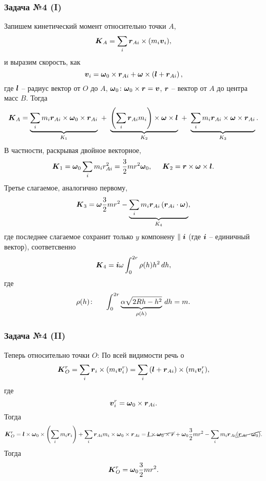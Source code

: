 \subsubsection*{Задача №4 (I)}

Запишем кинетический момент относительно точки $A$,
\begin{equation}
    \mbox{\boldmath $K$}_A = \sum_i \mbox{\boldmath $r$}_{Ai} \times (m_i \mbox{\boldmath $v$}_i),
\end{equation}
и выразим скорость, как
$$
    \mbox{\boldmath $v$}_i = \mbox{\boldmath $\omega$}_0 \times  \mbox{\boldmath $r$}_{Ai} + \mbox{\boldmath $\omega$} \times \left(
    \mbox{\boldmath $l$} + \mbox{\boldmath $r$}_{Ai}
    \right),
$$
где $\mbox{\boldmath $l$}$ -- радиус вектор от $O$ до $A$, $\mbox{\boldmath $\omega$}_0 \colon \mbox{\boldmath $\omega$}_0 \times \mbox{\boldmath $r$} = \mbox{\boldmath $v$}$, $\mbox{\boldmath $r$}$ -- вектор от $A$ до центра масс $B$.
Тогда
$$
    \mbox{\boldmath $K$}_A = 
    \underbrace{
        \sum_i m_i \mbox{\boldmath $r$}_{Ai} \times \mbox{\boldmath $\omega$}_0 \times \mbox{\boldmath $r$}_{Ai}
    }_{K_1}
    \ + \
    \underbrace{
        \left(\sum_i \mbox{\boldmath $r$}_{Ai} m_i\right) \times \mbox{\boldmath $\omega$} \times \mbox{\boldmath $l$}
    }_{K_2}
    \ + \
    \underbrace{
        \sum_i m_i \mbox{\boldmath $r$}_{Ai} \times \mbox{\boldmath $\omega$} \times \mbox{\boldmath $r$}_{Ai}
    }_{K_3}.
$$
В частности, раскрывая двойное векторное,
$$
    \mbox{\boldmath $K$}_1 = \mbox{\boldmath $\omega$}_0 \sum_i m_i r_{Ai}^2 = \frac{3}{2} m r^2 \mbox{\boldmath $\omega$}_0,
    \hspace{0.5cm} 
    \mbox{\boldmath $K$}_2 = \mbox{\boldmath $r$} \times \mbox{\boldmath $\omega$} \times \mbox{\boldmath $l$}.
$$
Третье слагаемое, аналогично первому,
$$
    \mbox{\boldmath $K$}_3 = \mbox{\boldmath $\omega$} \frac{3}{2} m r^2 -
    \underbrace{
    \sum_i m_i \mbox{\boldmath $r$}_{Ai} \left(\mbox{\boldmath $r$}_{Ai} \cdot \mbox{\boldmath $\omega$}\right)
    }_{K_4}
    ,
$$
где последнее слагаемое сохранит только $y$ компонену $\parallel \mbox{\boldmath $i$}$ (где $\mbox{\boldmath $i$}$ -- единичный вектор), соответсвенно
$$
    \mbox{\boldmath $K$}_4 = \mbox{\boldmath $i$} \omega \int_{0}^{2r} \rho(h) h^2 \, d h,
$$
где
$$
    \rho(h) \colon \hspace{0.5cm} 
    \int_{0}^{2r} 
    \underbrace{
    \alpha \sqrt{2 Rh - h^2} 
    }_{\rho(h)}
    \, d h 
    = m.
$$



\subsubsection*{Задача №4 (II)}

Теперь относительно точки $O$:
По всей видимости речь о 
$$
    \mbox{\boldmath $K$}_O^r = \sum_i \mbox{\boldmath $r$}_i \times (m_i \mbox{\boldmath $v$}^r_i) =
    \sum_i \left(\mbox{\boldmath $l$} + \mbox{\boldmath $r$}_{Ai}\right) \times (m_i \mbox{\boldmath $v$}^r_i)
    ,
$$
где
$$
    \mbox{\boldmath $v$}^r_i = \mbox{\boldmath $\omega$}_0 \times \mbox{\boldmath $r$}_{Ai}.
$$
Тогда
$$
    \mbox{\boldmath $K$}_O^r = 
    \mbox{\boldmath $l$} \times \mbox{\boldmath $\omega$}_0 \times \left(\sum_i m_i \mbox{\boldmath $r$}_i \right)
    +
    \sum_i \mbox{\boldmath $r$}_{Ai} m_i \times \mbox{\boldmath $\omega$}_0 \times \mbox{\boldmath $r$}_{Ai}
    =
    \cancel{
        \mbox{\boldmath $l$} \times \mbox{\boldmath $\omega$}_0 \times \mbox{\boldmath $r$}
    } +
    \mbox{\boldmath $\omega$}_0 \frac{3}{2} mr^2 - 
    \sum_i m_i
    \mbox{\boldmath $r$}_{Ai} \cancel{\left(\mbox{\boldmath $r$}_{Ai} \cdot \mbox{\boldmath $\omega$}_0\right)}
    .
$$
Тогда
$$
    \mbox{\boldmath $K$}_O^r = 
    \mbox{\boldmath $\omega$}_0 \frac{3}{2} mr^2.
$$